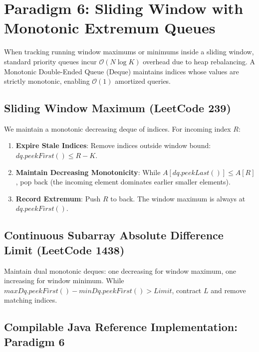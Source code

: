 \documentclass[10pt,journal,compsoc,onecolumn]{IEEEtran}
\begin{document}
\section{Paradigm 6: Sliding Window with Monotonic Extremum Queues}
\label{sec:monotonic-queues}

When tracking running window maximums or minimums inside a sliding window, standard priority queues incur $\mathcal{O}(N \log K)$ overhead due to heap rebalancing. A Monotonic Double-Ended Queue (Deque) maintains indices whose values are strictly monotonic, enabling $\mathcal{O}(1)$ amortized queries.

\subsection{Sliding Window Maximum (LeetCode 239)}
We maintain a monotonic decreasing deque of indices. For incoming index $R$:
\begin{enumerate}
    \item \textbf{Expire Stale Indices}: Remove indices outside window bound: $dq.peekFirst() \le R - K$.
    \item \textbf{Maintain Decreasing Monotonicity}: While $A[dq.peekLast()] \le A[R]$, pop back (the incoming element dominates earlier smaller elements).
    \item \textbf{Record Extremum}: Push $R$ to back. The window maximum is always at $dq.peekFirst()$.
\end{enumerate}

\subsection{Continuous Subarray Absolute Difference Limit (LeetCode 1438)}
Maintain dual monotonic deques: one decreasing for window maximum, one increasing for window minimum. While $maxDq.peekFirst() - minDq.peekFirst() > Limit$, contract $L$ and remove matching indices.

\subsection{Compilable Java Reference Implementation: Paradigm 6}
\end{document}
